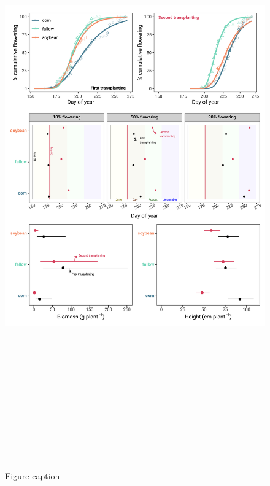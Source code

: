 \documentclass[utf8]{frontiersSCNS}
\begin{document}
\begin{figure}

{\centering \includegraphics[width=150mm,height=260mm]{../data analysis/figures/combine 3} 

}

\caption{Figure caption}\label{fig:Figure-2}
\end{figure}
\end{document}
